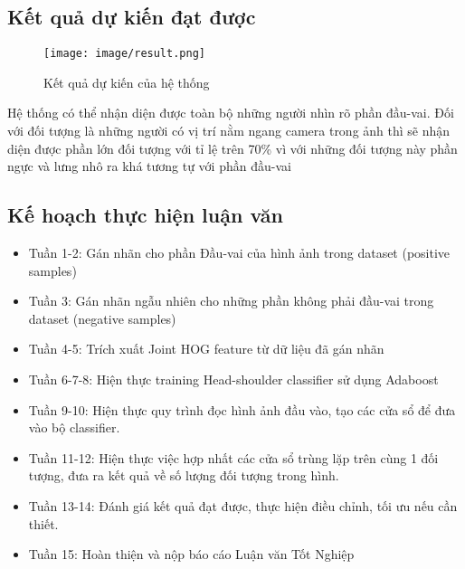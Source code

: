 \documentclass[12pt,a4paper]{article}
\begin{document}
		\subsection{Kết quả dự kiến đạt được}

    \begin{figure}[!ht]
        \centering
        \texttt{[image: image/result.png]}
        \caption{Kết quả dự kiến của hệ thống \cite{Head-shoulder}}
        \label{fig:my_label}
    \end{figure}
   Hệ thống có thể nhận diện được toàn bộ những người nhìn rõ phần đầu-vai. Đối với đối tượng là những người có vị trí nằm ngang camera trong ảnh thì sẽ nhận diện được phần lớn đối tượng với tỉ lệ trên 70\% vì với những đối tượng này phần ngực và lưng nhô ra khá tương tự với phần đầu-vai
\newpage
		\subsection{Kế hoạch thực hiện luận văn}
		\begin{itemize}
		    \item Tuần 1-2: Gán nhãn cho phần Đầu-vai của hình ảnh trong dataset (positive samples)
		    \item Tuần 3: Gán nhãn ngẫu nhiên cho những phần không phải đầu-vai trong dataset (negative samples)
		    \item Tuần 4-5: Trích xuất Joint HOG feature từ dữ liệu đã gán nhãn
		    \item Tuần 6-7-8: Hiện thực training Head-shoulder classifier sử dụng Adaboost
		    \item Tuần 9-10: Hiện thực quy trình đọc hình ảnh đầu vào, tạo các cửa sổ để đưa vào bộ classifier.
		    \item Tuần 11-12: Hiện thực việc hợp nhất các cửa sổ trùng lặp trên cùng 1 đối tượng, đưa ra kết quả về số lượng đối tượng trong hình.
		    \item  Tuần 13-14: Đánh giá kết quả đạt được, thực hiện điều chỉnh, tối ưu nếu cần thiết.
		    \item Tuần 15: Hoàn thiện và nộp báo cáo Luận văn Tốt Nghiệp

		\end{itemize}
        \newpage
\end{document}

